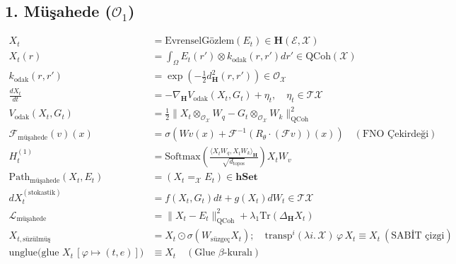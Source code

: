 \documentclass[11pt, a4paper]{article}
\begin{document}
\subsection{1. Müşahede ($\mathcal{O}_1$)}
\begin{align}
X_t &= \text{EvrenselGözlem}(E_t) \in \mathbf{H}(\mathcal{E}, \mathcal{X}) \\
X_t(r) &= \int_{\Omega} E_t(r') \otimes k_{\text{odak}}(r, r') dr' \in \text{QCoh}(\mathcal{X}) \\
k_{\text{odak}}(r, r') &= \exp\left( -\frac{1}{2} d_{\mathbf{H}}^2(r, r') \right) \in \mathcal{O}_{\mathcal{X}} \\
\frac{d X_t}{dt} &= -\nabla_{\mathbf{H}} V_{\text{odak}}(X_t, G_t) + \eta_t, \quad \eta_t \in \mathcal{T}\mathcal{X} \\
V_{\text{odak}}(X_t, G_t) &= \frac{1}{2} \|X_t \otimes_{\mathcal{O}_{\mathcal{X}}} W_q - G_t \otimes_{\mathcal{O}_{\mathcal{X}}} W_k\|_{\text{QCoh}}^2 \\
\mathcal{F}_{\text{müşahede}}(v)(x) &= \sigma\left( W v(x) + \mathcal{F}^{-1}\left( R_\theta \cdot (\mathcal{F} v) \right)(x) \right) \quad (\text{FNO Çekirdeği}) \\
H_t^{(1)} &= \text{Softmax}\left( \frac{\langle X_t W_q, X_t W_k \rangle_{\mathbf{H}}}{\sqrt{d_{\text{topos}}}} \right) X_t W_v \\
\text{Path}_{\text{müşahede}}(X_t, E_t) &= (X_t =_{\mathcal{X}} E_t) \in \mathbf{hSet} \\
d X_t^{(\text{stokastik})} &= f(X_t, G_t) dt + g(X_t) dW_t \in \mathcal{T}\mathcal{X} \\
\mathcal{L}_{\text{müşahede}} &= \| X_t - E_t \|_{\text{QCoh}}^2 + \lambda_1 \text{Tr}(\Delta_{\mathbf{H}} X_t) \\
X_{t, \text{süzülmüş}} &= X_t \odot \sigma(W_{\text{süzgeç}} X_t); \quad \text{transp}^i (\lambda i.\, \mathcal{X}) \, \varphi \, X_t \equiv X_t \ (\text{SABİT çizgi}) \\
\text{unglue}\big(\text{glue } X_t \, [\varphi \mapsto (t, e)]\big) &\equiv X_t \quad (\text{Glue } \beta\text{-kuralı})
\end{align}
\end{document}
